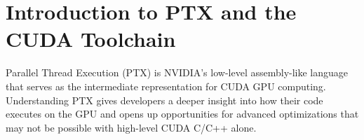 \section{Introduction to PTX and the CUDA Toolchain}

Parallel Thread Execution (PTX) is NVIDIA's low-level assembly-like language that serves as the intermediate representation for CUDA GPU computing. Understanding PTX gives developers a deeper insight into how their code executes on the GPU and opens up opportunities for advanced optimizations that may not be possible with high-level CUDA C/C++ alone.

